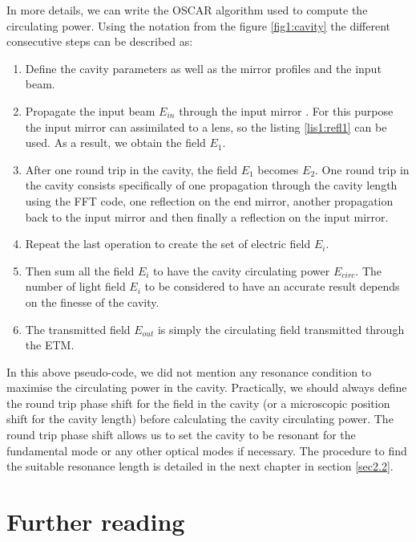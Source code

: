 In more details, we can write the OSCAR algorithm used to compute the circulating power. Using the notation from the figure \ref{fig1:cavity} the different consecutive steps can be described as:

\begin{enumerate}
  \item Define the cavity parameters as well as the mirror profiles and the input beam.
  \item Propagate the input beam $E_{in}$ through the input mirror . For this purpose the input mirror can assimilated to a lens, so the listing \ref{lis1:refl1} can be used. As a result, we obtain the field $E_1$.
  \item After one round trip in the cavity, the field $E_1$ becomes $E_2$. One round trip in the cavity consists specifically of one propagation through the cavity length using the FFT code, one reflection on the end mirror, another propagation back to the input mirror and then finally a reflection on the input mirror.
  \item Repeat the last operation to create the set of electric field $E_i$.
  \item Then sum all the field $E_i$ to have the cavity circulating power $E_{circ}$. The number of light field $E_i$ to be considered to have an accurate result depends on the finesse of the cavity.
  \item The transmitted field $E_{out}$ is simply the circulating field transmitted through the ETM.
\end{enumerate}

In this above pseudo-code, we did not mention any resonance condition to maximise the circulating power in the cavity. Practically, we should always define the round trip phase shift for the field in the cavity (or a microscopic position shift for the cavity length) before calculating the cavity circulating power. The round trip phase shift allows us to set the cavity to be resonant for the fundamental mode or any other optical modes if necessary. The procedure to find the suitable resonance length is detailed in the next chapter in section \ref{sec2.2}.

\section{Further reading}


